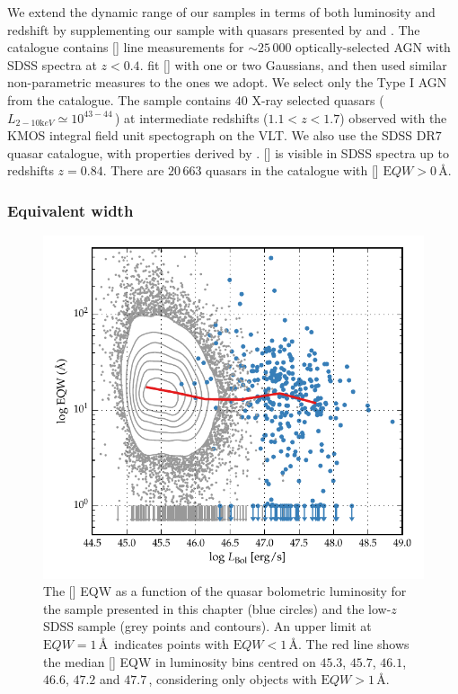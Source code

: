 We extend the dynamic range of our samples in terms of both luminosity and redshift by supplementing our sample with quasars presented by \citet{mullaney13} and \citet{harrison16}. 
The \citet{mullaney13} catalogue contains [] line measurements for $\sim25\,000$ optically-selected AGN with SDSS spectra at $z<0.4$.
\citet{mullaney13} fit [] with one or two Gaussians, and then used similar non-parametric measures to the ones we adopt.
We select only the Type I AGN from the \citet{mullaney13} catalogue. 
The \citet{harrison16} sample contains $40$ X-ray selected quasars ($L_{2-10 {\mathrm keV}} \simeq 10^{43-44}$\,\ergs) at intermediate redshifts ($1.1 < z < 1.7$) observed with the KMOS integral field unit spectograph on the VLT. 
We also use the SDSS DR$7$ quasar catalogue, with properties derived by \citet{shen11}. 
[] is visible in SDSS spectra up to redshifts $z=0.84$. 
There are $20\,663$ quasars in the \citet{shen11} catalogue with [] ${\mathrm EQW} > 0$\,\AA. 

\subsubsection{Equivalent width}

\begin{figure}[t!]
\centering 
    \includegraphics[width=\columnwidth]{figures/chapter04/eqw_lum.pdf} 
    \caption[{The [] EQW as a function of the quasar bolometric luminosity for the sample presented in this chapter (blue circles) and the low-$z$ SDSS sample (grey points and contours).}]{The [] EQW as a function of the quasar bolometric luminosity for the sample presented in this chapter (blue circles) and the low-$z$ SDSS sample (grey points and contours). An upper limit at ${\mathrm EQW}=1$\,\AA\, indicates points with ${\mathrm EQW} < 1$\,\AA. The red line shows the median [] EQW in luminosity bins centred on $45.3$, $45.7$, $46.1$, $46.6$, $47.2$ and $47.7$\,\ergs, considering only objects with ${\mathrm EQW} > 1 $\,\AA.}     
    \label{fig:eqw_lum}
\end{figure}


